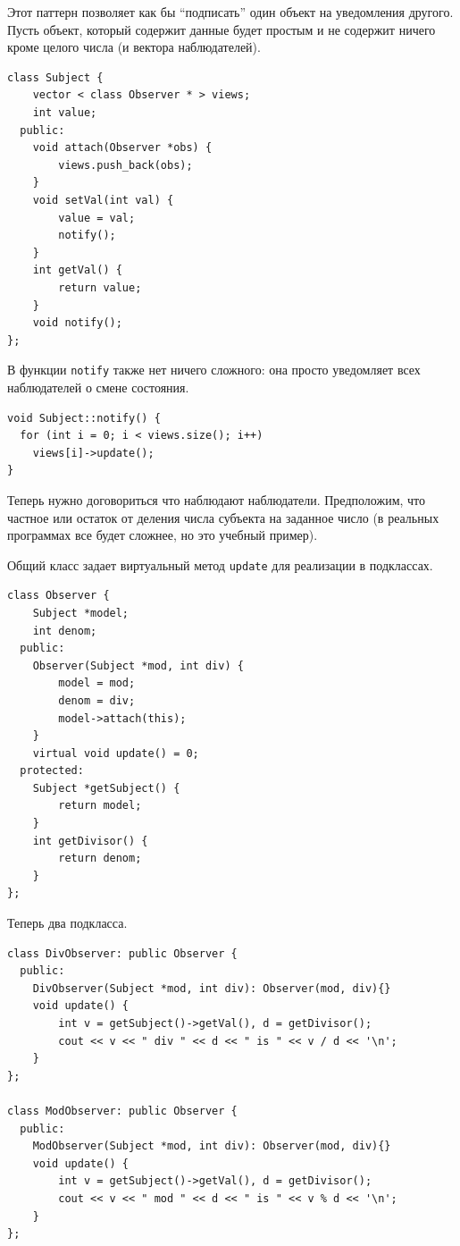 \documentclass[a4paper,12pt,oneside]{book}
\begin{document}
Этот паттерн позволяет как бы ``подписать'' один объект на уведомления другого. Пусть объект, который содержит данные будет простым и не содержит ничего кроме целого числа (и вектора наблюдателей).

\begin{lstlisting}
class Subject {
    vector < class Observer * > views; 
    int value;
  public:
    void attach(Observer *obs) {
        views.push_back(obs);
    }
    void setVal(int val) {
        value = val;
        notify();
    }
    int getVal() {
        return value;
    }
    void notify();
};
\end{lstlisting}

В функции \lstinline!notify! также нет ничего сложного: она просто уведомляет всех наблюдателей о смене состояния.

\begin{lstlisting}
void Subject::notify() {
  for (int i = 0; i < views.size(); i++)
    views[i]->update();
}
\end{lstlisting}

Теперь нужно договориться что наблюдают наблюдатели. Предположим, что частное или остаток от деления числа субъекта на заданное число (в реальных программах все будет сложнее, но это учебный пример).

Общий класс задает виртуальный метод \lstinline!update! для реализации в подклассах.

\begin{lstlisting}
class Observer {
    Subject *model;
    int denom;
  public:
    Observer(Subject *mod, int div) {
        model = mod;
        denom = div;
        model->attach(this);
    }
    virtual void update() = 0;
  protected:
    Subject *getSubject() {
        return model;
    }
    int getDivisor() {
        return denom;
    }
};
\end{lstlisting}

Теперь два подкласса.

\begin{lstlisting}
class DivObserver: public Observer {
  public:
    DivObserver(Subject *mod, int div): Observer(mod, div){}
    void update() {
        int v = getSubject()->getVal(), d = getDivisor();
        cout << v << " div " << d << " is " << v / d << '\n';
    }
};

class ModObserver: public Observer {
  public:
    ModObserver(Subject *mod, int div): Observer(mod, div){}
    void update() {
        int v = getSubject()->getVal(), d = getDivisor();
        cout << v << " mod " << d << " is " << v % d << '\n';
    }
};
\end{lstlisting}
\end{document}
